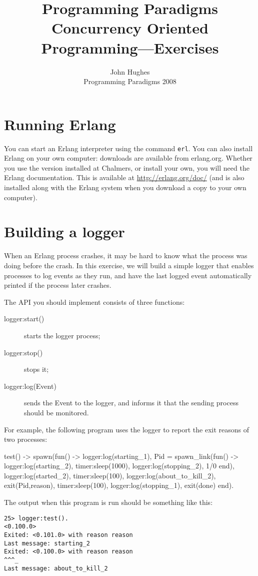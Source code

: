 \documentclass{article}
\newcommand{\courseinfo}{ John Hughes \\ Programming Paradigms 2008 }
\begin{document}
\title{Programming Paradigms 
\\
Concurrency Oriented Programming—Exercises}
\author{\courseinfo}
\date{}
\maketitle

\section{Running Erlang}

You can start an Erlang interpreter using the command \verb!erl!. You
can also install Erlang on your own computer: downloads are available
from erlang.org. Whether you use the version installed at Chalmers, or
install your own, you will need the Erlang documentation. This is
available at \url{http://erlang.org/doc/} (and is also installed along
with the Erlang system when you download a copy to your own computer).


\section{Building a logger}

When an Erlang process crashes, it may be hard to know what the
process was doing before the crash. In this exercise, we will build a
simple logger that enables processes to log events as they run, and
have the last logged event automatically printed if the process later
crashes.

The API you should implement consists of three functions:

\begin{description}
\item[\textsf{logger:start()}]  starts the logger process;
\item[\textsf{logger:stop()}]   stops it;
\item[\textsf{logger:log(Event)}] sends the \textsf{Event} to the logger, and
  informs it that the sending process should be monitored.
\end{description}

For example, the following program uses the logger to report the exit reasons of two processes:
\begin{erlang}
test() ->
    spawn(fun() ->
	  logger:log(starting_1),
	  Pid = spawn_link(fun() ->
			   logger:log(starting_2),
			   timer:sleep(1000),
			   logger:log(stopping_2),
			   1/0
		   end),
	  logger:log(started_2),
	  timer:sleep(100),
	  logger:log(about_to_kill_2),
	  exit(Pid,reason),
	  timer:sleep(100),
	  logger:log(stopping_1),
	  exit(done)
	end).
\end{erlang}
The output when this program is run should be something  like this:
\begin{verbatim}
25> logger:test().
<0.100.0>
Exited: <0.101.0> with reason reason
Last message: starting_2
Exited: <0.100.0> with reason reason
^^^_
Last message: about_to_kill_2
\end{verbatim}
\end{document}
